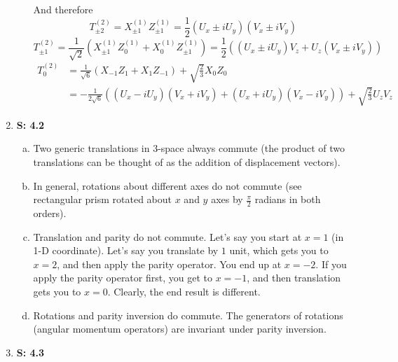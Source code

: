 \documentclass[12pt, letterpaper]{article}
\begin{document}
\begin{enumerate}
\begin{enumerate}[(a)]
And therefore
\begin{equation}
        T^{(2)}_{\pm 2}=X_{\pm 1}^{(1)}Z_{\pm 1}^{(1)}=\frac{1}{2}\left(U_x\pm iU_y\right)\left(V_x\pm iV_y\right)
\end{equation}
\begin{equation}
        T^{(2)}_{\pm 1}=\frac{1}{\sqrt{2}}\left(X_{\pm 1}^{(1)}Z_0^{(1)}+X_0^{(1)}Z_{\pm 1}^{(1)}\right)=\frac{1}{2}\left(\left(U_x\pm iU_y\right)V_z+U_z(V_x\pm iV_y)\right)
\end{equation}
\begin{align}
    T_0^{(2)}&=\frac{1}{\sqrt{6}}\left(X_{-1}Z_1+X_1Z_{-1}\right)+\sqrt{\frac{2}{3}}X_0Z_0\\&=-\frac{1}{2\sqrt{6}}\left((U_x-iU_y)(V_x+iV_y)+(U_x+iU_y)(V_x-iV_y)\right)+\sqrt{\frac{2}{3}}U_zV_z
\end{align}
\end{enumerate}


    \item[] \textbf{S: 4.2}
    
    \begin{enumerate}[(a)]
        \item Two generic translations in 3-space always commute (the product of two translations can be thought of as the addition of displacement vectors).
        \item In general, rotations about different axes do not commute (see rectangular prism rotated about $x$ and $y$ axes by $\frac{\pi}{2}$ radians in both orders).
        \item Translation and parity do not commute. Let's say you start at $x=1$ (in 1-D coordinate). Let's say you translate by $1$ unit, which gets you to $x=2$, and then apply the parity operator. You end up at $x=-2$. If you apply the parity operator first, you get to $x=-1$, and then translation gets you to $x=0$. Clearly, the end result is different.
        \item Rotations and parity inversion do commute. The generators of rotations (angular momentum operators) are invariant under parity inversion. 
    \end{enumerate}
    
    
    \item[] \textbf{S: 4.3}
        

\end{enumerate}
\end{document}
